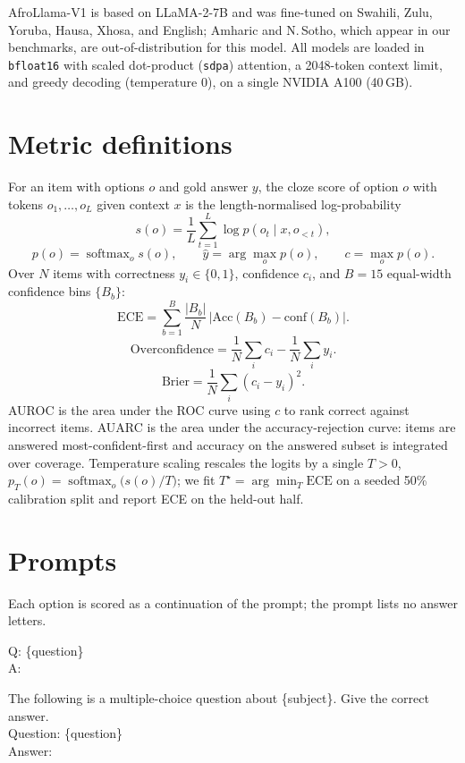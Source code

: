 \documentclass[11pt]{article}
\newcommand{\acc}{\mathrm{Acc}}
\begin{document}
AfroLlama-V1 is based on LLaMA-2-7B and was fine-tuned on Swahili, Zulu, Yoruba, Hausa, Xhosa, and
English; Amharic and N.\,Sotho, which appear in our benchmarks, are out-of-distribution for this
model. All models are loaded in \texttt{bfloat16} with scaled dot-product (\texttt{sdpa}) attention,
a 2048-token context limit, and greedy decoding (temperature 0), on a single NVIDIA A100 (40\,GB).

\section{Metric definitions}\label{app:metrics}
For an item with options $o$ and gold answer $y$, the cloze score of option $o$ with tokens
$o_1,\dots,o_L$ given context $x$ is the length-normalised log-probability
\[
s(o) = \frac{1}{L}\sum_{t=1}^{L}\log p(o_t \mid x, o_{<t}),
\]
\[
p(o) = \operatorname{softmax}_o s(o),
\qquad \hat{y}=\arg\max_o p(o), \qquad c=\max_o p(o).
\]
Over $N$ items with correctness $y_i\in\{0,1\}$, confidence $c_i$, and $B=15$ equal-width confidence
bins $\{B_b\}$:
\[
\mathrm{ECE}=\sum_{b=1}^{B}\frac{|B_b|}{N}\,\bigl|\acc(B_b)-\mathrm{conf}(B_b)\bigr| .
\]
\[
\text{Overconfidence}=\frac{1}{N}\sum_i c_i-\frac{1}{N}\sum_i y_i .
\]
\[
\text{Brier}=\frac{1}{N}\sum_i (c_i-y_i)^2 .
\]
AUROC is the area under the ROC curve using $c$ to rank correct against incorrect items. AUARC is the
area under the accuracy-rejection curve: items are answered most-confident-first and accuracy on the
answered subset is integrated over coverage. Temperature scaling rescales the logits by a single
$T>0$, $p_T(o)=\operatorname{softmax}_o\!\big(s(o)/T\big)$; we fit $T^\star=\arg\min_T \mathrm{ECE}$
on a seeded 50\% calibration split and report ECE on the held-out half.

\section{Prompts}\label{app:scoring}
Each option is scored as a continuation of the prompt; the prompt lists no answer letters.

\begin{tcolorbox}[colback=blue!4,colframe=blue!45,title=\textbf{Uhura-TruthfulQA (truthfulness)},fonttitle=\small,boxrule=0.5pt]
\ttfamily\small Q: \{question\}\\ A:
\end{tcolorbox}

\begin{tcolorbox}[colback=blue!4,colframe=blue!45,title=\textbf{AfriMMLU (knowledge)},fonttitle=\small,boxrule=0.5pt]
\ttfamily\small The following is a multiple-choice question about \{subject\}. Give the correct answer.\\[3pt]
Question: \{question\}\\ Answer:
\end{tcolorbox}
\end{document}
